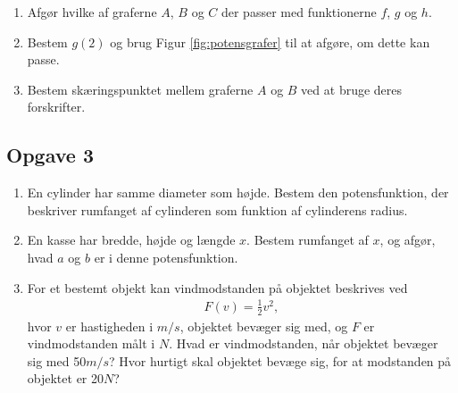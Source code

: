 \begin{enumerate}[label=\roman*)]
	\item Afgør hvilke af graferne $A$, $B$ og $C$ der passer med funktionerne $f$, $g$ og $h$.
	\item Bestem $g(2)$ og brug Figur \ref{fig:potensgrafer} til at afgøre, om dette kan passe.
	\item Bestem skæringspunktet mellem graferne $A$ og $B$ ved at bruge deres forskrifter.
\end{enumerate}

\subsection*{Opgave 3}

\begin{enumerate}[label=\roman*)]
\item En cylinder har samme diameter som højde. Bestem den potensfunktion, der beskriver rumfanget af cylinderen som funktion af cylinderens radius. 
\item En kasse har bredde, højde og længde $x$. Bestem rumfanget af $x$, og afgør, hvad $a$ og $b$ er i denne potensfunktion.
\item For et bestemt objekt kan vindmodstanden på objektet beskrives ved 
\begin{align*}
F(v)= \frac{1}{2}v^2,
\end{align*}
hvor $v$ er hastigheden i $m/s$, objektet bevæger sig med, og $F$ er vindmodstanden målt i $N$. Hvad er vindmodstanden, når objektet bevæger sig med 50$m/s$? Hvor hurtigt skal objektet bevæge sig, for at modstanden på objektet er 20$N$?
\end{enumerate}